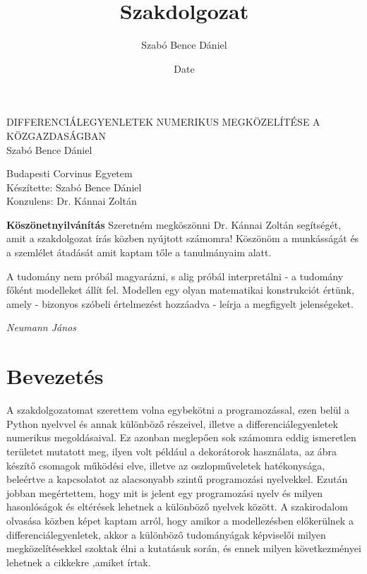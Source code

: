 \documentclass{article}
\title{Szakdolgozat}
\author{Szabó Bence Dániel }
\date{Date}
\theoremstyle{definition}
\theoremstyle{theorem}
\begin{document}
\begin{center}
\fontsize{40pt}{12pt}\selectfont

    DIFFERENCIÁLEGYENLETEK NUMERIKUS MEGKÖZELÍTÉSE A KÖZGAZDASÁGBAN\\
    \bigskip
    Szabó Bence Dániel \\
\end{center}

\pagebreak

\begin{center}
\fontsize{40pt}{12pt}\selectfont
    Budapesti Corvinus Egyetem \\
    \bigskip
    Készítette: Szabó Bence Dániel \\
    \bigskip
    Konzulens: Dr. Kánnai Zoltán\\
\end{center}
\pagebreak
\tableofcontents
\pagebreak
\textbf{Köszönetnyilvánítás} \newline
Szeretném megköszönni Dr. Kánnai Zoltán segítségét, amit a szakdolgozat írás közben nyújtott számomra! Köszönöm a munkásságát és a szemlélet átadását amit kaptam tőle a tanulmányaim alatt.

\pagebreak
\epigraph{A tudomány nem próbál magyarázni, s alig próbál interpretálni - a tudomány főként modelleket állít fel. Modellen egy olyan matematikai konstrukciót értünk, amely - bizonyos szóbeli értelmezést hozzáadva - leírja a megfigyelt jelenségeket.}{\textit{Neumann János}}
\pagebreak
\section{Bevezetés}
A szakdolgozatomat szerettem volna egybekötni a programozással, ezen belül a Python nyelvvel és annak különböző részeivel, illetve a differenciálegyenletek numerikus megoldásaival. Ez azonban meglepően sok számomra eddig ismeretlen területet mutatott meg, ilyen volt például a dekorátorok használata, az ábra készítő csomagok működési elve, illetve az oszlopműveletek hatékonysága, beleértve a kapcsolatot az alacsonyabb szintű programozási nyelvekkel. Ezután jobban megértettem, hogy mit is jelent egy programozási nyelv és milyen hasonlóságok és eltérések lehetnek a különböző nyelvek között. A szakirodalom olvasása közben képet kaptam arról, hogy amikor a modellezésben előkerülnek a differenciálegyenletek, akkor a különböző tudományágak képviselői milyen megközelítésekkel szoktak élni a kutatásuk során, és ennek milyen következményei lehetnek a cikkekre ,amiket írtak.
\end{document}
